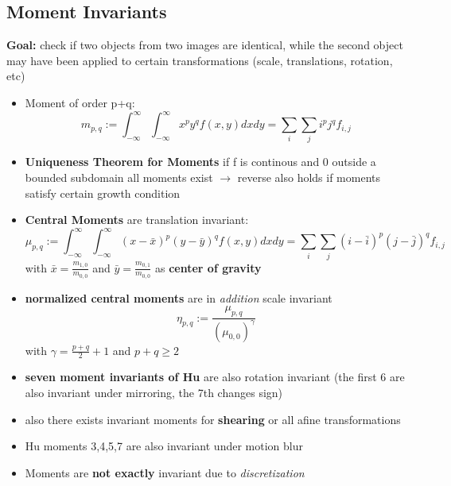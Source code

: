 \documentclass[11pt]{article}
\begin{document}
\subsection{Moment Invariants}
\label{sec-2-5}
\textbf{Goal:} check if two objects from two images are identical, while the second
object may have been applied to certain transformations (scale, translations, rotation, etc)
\begin{itemize}
\item Moment of order p+q:
     \[ m_{p,q}:= \int_{-\infty}^{\infty}\int_{-\infty}^\infty x^p y^q f(x,y)dxdy = 
        \sum_i \sum_j i^p j^q f_{i,j} \]
\item \textbf{Uniqueness Theorem for Moments} if f is continous and 0 outside a bounded subdomain
all moments exist $\rightarrow$ reverse also holds if moments satisfy certain growth
condition
\item \textbf{Central Moments} are translation invariant:
\[ \mu_{p,q} := \int_{-\infty}^\infty \int_{-\infty}^\infty 
        (x-\bar{x})^p (y-\bar{y})^q f(x,y) dx dy = 
	\sum_i \sum_j (i-\bar{i})^p (j-\bar{j})^q f_{i,j}\]
with $\bar{x}=\frac{m_{1,0}}{m_{0,0}}$ and $\bar{y}=\frac{m_{0,1}}{m_{0,0}}$
as \textbf{center of gravity}
\item \textbf{normalized central moments} are in \emph{addition} scale invariant
\[ \eta_{p,q} := \frac{\mu_{p,q}}{(\mu_{0,0})^\gamma} \]
with $\gamma = \frac{p+q}{2}+1$ and $p+q \ge 2$
\item \textbf{seven moment invariants of Hu} are also rotation invariant (the first 6 are also
invariant under mirroring, the 7th changes sign)
\item also there exists invariant moments for \textbf{shearing} or all afine transformations
\item Hu moments 3,4,5,7 are also invariant under motion blur
\item Moments are \textbf{not exactly} invariant due to \emph{discretization}
\end{itemize}
\end{document}
